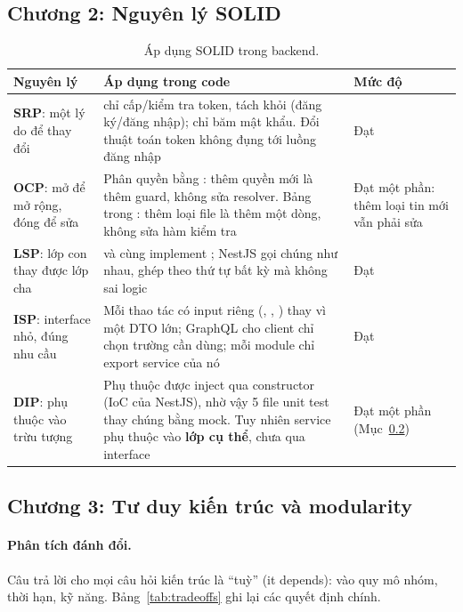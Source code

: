 \documentclass[11pt, a4paper]{article}
\begin{document}
\subsection{Chương 2: Nguyên lý SOLID}

\begin{table}[H]
  \centering
  \small
  \caption{Áp dụng SOLID trong backend.}
  \label{tab:solid}
  \begin{tabularx}{\linewidth}{P{2.6cm}YP{3cm}}
    \toprule
    \textbf{Nguyên lý} & \textbf{Áp dụng trong code} & \textbf{Mức độ} \\
    \midrule
    \textbf{SRP}: một lý do để thay đổi &  chỉ cấp/kiểm tra token, tách khỏi  (đăng ký/đăng nhập);  chỉ băm mật khẩu. Đổi thuật toán token không đụng tới luồng đăng nhập & Đạt \\
    \textbf{OCP}: mở để mở rộng, đóng để sửa & Phân quyền bằng : thêm quyền mới là thêm guard, không sửa resolver. Bảng  trong : thêm loại file là thêm một dòng, không sửa hàm kiểm tra & Đạt một phần: thêm loại tin mới vẫn phải sửa  \\
    \textbf{LSP}: lớp con thay được lớp cha &  và  cùng implement ; NestJS gọi chúng như nhau, ghép theo thứ tự bất kỳ mà không sai logic & Đạt \\
    \textbf{ISP}: interface nhỏ, đúng nhu cầu & Mỗi thao tác có input riêng (, , ) thay vì một DTO lớn; GraphQL cho client chỉ chọn trường cần dùng; mỗi module chỉ export service của nó & Đạt \\
    \textbf{DIP}: phụ thuộc vào trừu tượng & Phụ thuộc được inject qua constructor (IoC của NestJS), nhờ vậy 5 file unit test thay chúng bằng mock. Tuy nhiên service phụ thuộc vào \textbf{lớp cụ thể}, chưa qua interface & Đạt một phần (Mục~\ref{sec:ch3}) \\
    \bottomrule
  \end{tabularx}
\end{table}

\subsection{Chương 3: Tư duy kiến trúc và modularity}
\label{sec:ch3}

\paragraph{Phân tích đánh đổi.} Câu trả lời cho mọi câu hỏi kiến trúc là ``tuỳ'' (it depends): vào quy mô nhóm, thời hạn, kỹ năng. Bảng~\ref{tab:tradeoffs} ghi lại các quyết định chính.
\end{document}
